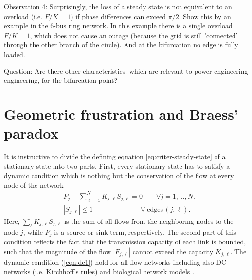 \documentclass[10pt,aps,pra,twocolumn,superscriptaddress]{revtex4-1}
\begin{document}
Observation 4:
Surprisingly, the loss of a steady state is not equivalent to an overload (i.e. $F/K = 1$) if phase differences can exceed $\pi/2$.  Show this by an example in the 6-bus ring network. In this example there is a single overload $F/K=1$, which does not cause an outage (because the grid is still 'connected' through the other branch of the circle). And at the bifurcation no edge is fully loaded.

Question: Are there other characteristics, which are relevant to power engineering engineering, for the bifurcation point?

\section{Geometric frustration and Braess' paradox}

It is instructive to divide the defining equation 
\eqref{eq:criter-steady-state} of a 
stationary state  into two parts.
First, every stationary state has to satisfy a dynamic condition 
which is nothing but the conservation of the flow at every node
of the network
\begin{subequations}
\label{eqn:dc1}
\begin{align}
   & P_j + \sum_{\ell=1}^N K _{j,\ell} S_{j,\ell} = 0 \qquad 
              \forall j=1,\ldots,N. \\
  &  |S_{j,\ell}|   \le 1 \quad \qquad \qquad \qquad  
              \forall \; \mbox{edges} \, (j,\ell).
\end{align} 
\end{subequations}
Here, $\sum_\ell K_{j,\ell}S_{j,\ell}$ is the sum of all 
flows from the neighboring nodes to the node $j$, while 
$P_j$ is a source or sink term, respectively.
The second part of this condition reflects the fact that the
transmission capacity of each link is bounded, such that the
magnitude of the flow $|F_{j,\ell}|$ cannot exceed the capacity
$K_{j,\ell}$.  
The dynamic condition (\ref{eqn:dc1}) hold for
all flow networks including also DC networks (i.e. Kirchhoff's
rules) and biological network models \cite{Kati10}. 
\end{document}
